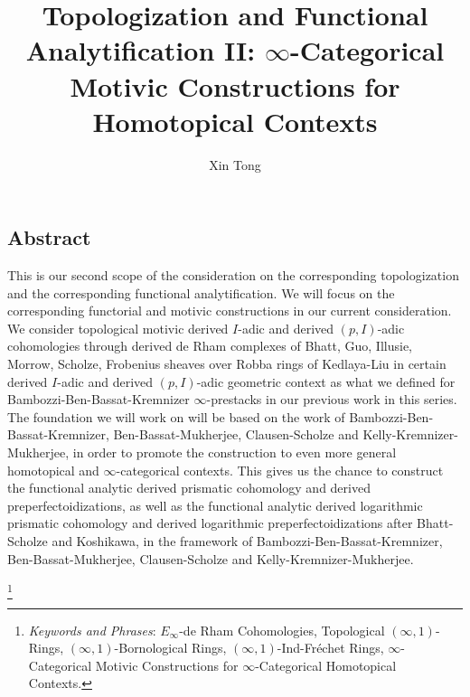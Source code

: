 \documentclass[11pt]{book}
\theoremstyle{definition}
\numberwithin{equation}{section}
\begin{document}
\normalfont



\title{Topologization and Functional Analytification II: $\infty$-Categorical Motivic Constructions for Homotopical Contexts}
\author{Xin Tong}
\date{}


\maketitle

\subsection*{Abstract}
This is our second scope of the consideration on the corresponding topologization and the corresponding functional analytification. We will focus on the corresponding functorial and motivic constructions in our current consideration. We consider topological motivic derived $I$-adic and derived $(p,I)$-adic cohomologies through derived de Rham complexes of Bhatt, Guo, Illusie, Morrow, Scholze, Frobenius sheaves over Robba rings of Kedlaya-Liu in certain derived $I$-adic and derived $(p,I)$-adic geometric context as what we defined for Bambozzi-Ben-Bassat-Kremnizer $\infty$-prestacks in our previous work in this series. The foundation we will work on will be based on the work of Bambozzi-Ben-Bassat-Kremnizer, Ben-Bassat-Mukherjee, Clausen-Scholze and Kelly-Kremnizer-Mukherjee, in order to promote the construction to even more general homotopical and $\infty$-categorical contexts. This gives us the chance to construct the functional analytic derived prismatic cohomology and derived preperfectoidizations, as well as the functional analytic derived logarithmic prismatic cohomology and derived logarithmic preperfectoidizations after Bhatt-Scholze and Koshikawa, in the framework of Bambozzi-Ben-Bassat-Kremnizer, Ben-Bassat-Mukherjee, Clausen-Scholze and Kelly-Kremnizer-Mukherjee. 



\newpage

\footnote{\textit{Keywords and Phrases}: $E_\infty$-de Rham Cohomologies, Topological $(\infty,1)$-Rings, $(\infty,1)$-Bornological Rings, $(\infty,1)$-Ind-Fr\'echet Rings, $\infty$-Categorical Motivic Constructions for $\infty$-Categorical Homotopical Contexts.}


\newpage

\tableofcontents
\end{document}

